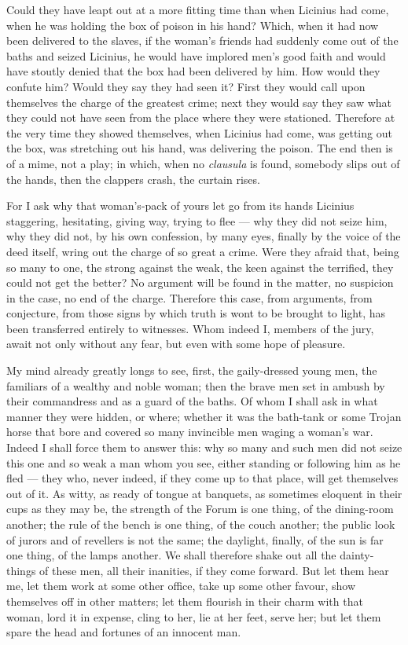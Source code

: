  Could they have leapt out at a more fitting time than when Licinius had come, when he was holding the box of poison in his hand? Which, when it had now been delivered to the slaves, if the woman's friends had suddenly come out of the baths and seized Licinius, he would have implored men's good faith and would have stoutly denied that the box had been delivered by him. How would they confute him? Would they say they had seen it? First they would call upon themselves the charge of the greatest crime; next they would say they saw what they could not have seen from the place where they were stationed. Therefore at the very time they showed themselves, when Licinius had come, was getting out the box, was stretching out his hand, was delivering the poison. The end then is of a mime, not a play; in which, when no \textit{clausula} is found, somebody slips out of the hands, then the clappers crash, the curtain rises.

 For I ask why that woman's-pack of yours let go from its hands Licinius staggering, hesitating, giving way, trying to flee --- why they did not seize him, why they did not, by his own confession, by many eyes, finally by the voice of the deed itself, wring out the charge of so great a crime. Were they afraid that, being so many to one, the strong against the weak, the keen against the terrified, they could not get the better? No argument will be found in the matter, no suspicion in the case, no end of the charge. Therefore this case, from arguments, from conjecture, from those signs by which truth is wont to be brought to light, has been transferred entirely to witnesses. Whom indeed I, members of the jury, await not only without any fear, but even with some hope of pleasure.

 My mind already greatly longs to see, first, the gaily-dressed young men, the familiars of a wealthy and noble woman; then the brave men set in ambush by their commandress and as a guard of the baths. Of whom I shall ask in what manner they were hidden, or where; whether it was the bath-tank or some Trojan horse that bore and covered so many invincible men waging a woman's war. Indeed I shall force them to answer this: why so many and such men did not seize this one and so weak a man whom you see, either standing or following him as he fled --- they who, never indeed, if they come up to that place, will get themselves out of it. As witty, as ready of tongue at banquets, as sometimes eloquent in their cups as they may be, the strength of the Forum is one thing, of the dining-room another; the rule of the bench is one thing, of the couch another; the public look of jurors and of revellers is not the same; the daylight, finally, of the sun is far one thing, of the lamps another. We shall therefore shake out all the dainty-things of these men, all their inanities, if they come forward. But let them hear me, let them work at some other office, take up some other favour, show themselves off in other matters; let them flourish in their charm with that woman, lord it in expense, cling to her, lie at her feet, serve her; but let them spare the head and fortunes of an innocent man.

